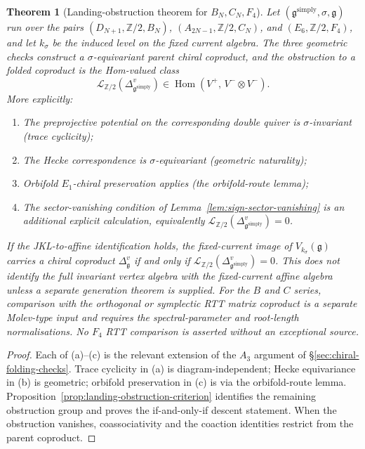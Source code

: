 \documentclass[11pt]{amsart}
\newtheorem{theorem}{Theorem}[section]
\theoremstyle{definition}
\theoremstyle{remark}
\providecommand{\fg}{\mathfrak{g}}
\begin{document}
\begin{theorem}[Landing-obstruction theorem for $B_N, C_N, F_4$]%
\label{thm:folded-chiral-BCF}%
Let $(\fg^{\mathrm{simply}}, \sigma, \fg)$ run over the pairs
$(D_{N+1}, \mathbb{Z}/2, B_N)$,
$(A_{2N-1}, \mathbb{Z}/2, C_N)$, and
$(E_6, \mathbb{Z}/2, F_4)$, and let $k_\sigma$ be the induced level on
the fixed current algebra. The three geometric checks construct a
$\sigma$-equivariant parent chiral coproduct, and the obstruction to a
folded coproduct is the Hom-valued class
\[
  \mathcal L_{\mathbb Z/2}(\Delta^v_{\fg^{\mathrm{simply}}})
  \in
  \operatorname{Hom}\!\left(
    V^+,\,
    V^-\otimes V^-
  \right).
\]
More explicitly:
\begin{enumerate}[label=\textup{(\alph*)}]
\item The preprojective potential on the corresponding double quiver
  is $\sigma$-invariant (trace cyclicity);
\item The Hecke correspondence is $\sigma$-equivariant (geometric
  naturality);
\item Orbifold $E_1$-chiral preservation applies (the orbifold-route lemma);
\item The sector-vanishing condition of
  Lemma~\ref{lem:sign-sector-vanishing} is an additional explicit
  calculation, equivalently
  $\mathcal L_{\mathbb Z/2}(\Delta^v_{\fg^{\mathrm{simply}}})=0$.
\end{enumerate}
If the JKL-to-affine identification holds, the fixed-current image of
$V_{k_\sigma}(\fg)$ carries a chiral coproduct $\Delta^v_{\fg}$ if and
only if
$\mathcal L_{\mathbb Z/2}(\Delta^v_{\fg^{\mathrm{simply}}})=0$.
This does not identify the full invariant vertex algebra with the
fixed-current affine algebra unless a separate generation theorem is
supplied. For the $B$ and $C$ series, comparison with the orthogonal or
symplectic RTT matrix coproduct is a separate Molev-type input and
requires the spectral-parameter and root-length normalisations. No
$F_4$ RTT comparison is asserted without an exceptional source.
\end{theorem}

\begin{proof}
Each of (a)--(c) is the relevant extension of the $A_3$ argument of
\S\ref{sec:chiral-folding-checks}. Trace cyclicity
in (a) is diagram-independent; Hecke equivariance in (b) is
geometric; orbifold preservation in (c) is via the orbifold-route
lemma. Proposition~\ref{prop:landing-obstruction-criterion} identifies
the remaining obstruction group and proves the if-and-only-if descent
statement. When the obstruction vanishes, coassociativity and the
coaction identities restrict from the parent coproduct.
\end{proof}
\end{document}
